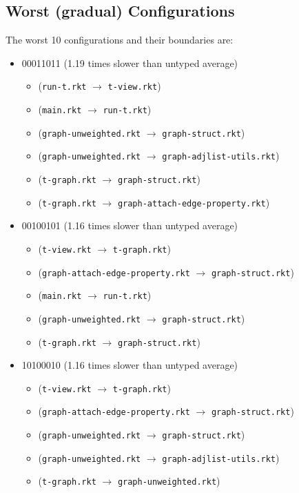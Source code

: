 \documentclass{article}
\newcommand{\mono}[1]{\texttt{#1}}
\begin{document}
\subsection{Worst (gradual) Configurations}
The worst 10 configurations and their boundaries are:
\begin{itemize}
\item 00011011 (1.19 times slower than untyped average)
  \begin{itemize}
  \item (\mono{run-t.rkt} $\rightarrow$ \mono{t-view.rkt})
  \item (\mono{main.rkt} $\rightarrow$ \mono{run-t.rkt})
  \item (\mono{graph-unweighted.rkt} $\rightarrow$ \mono{graph-struct.rkt})
  \item (\mono{graph-unweighted.rkt} $\rightarrow$ \mono{graph-adjlist-utils.rkt})
  \item (\mono{t-graph.rkt} $\rightarrow$ \mono{graph-struct.rkt})
  \item (\mono{t-graph.rkt} $\rightarrow$ \mono{graph-attach-edge-property.rkt})
  \end{itemize}
\item 00100101 (1.16 times slower than untyped average)
  \begin{itemize}
  \item (\mono{t-view.rkt} $\rightarrow$ \mono{t-graph.rkt})
  \item (\mono{graph-attach-edge-property.rkt} $\rightarrow$ \mono{graph-struct.rkt})
  \item (\mono{main.rkt} $\rightarrow$ \mono{run-t.rkt})
  \item (\mono{graph-unweighted.rkt} $\rightarrow$ \mono{graph-struct.rkt})
  \item (\mono{t-graph.rkt} $\rightarrow$ \mono{graph-struct.rkt})
  \end{itemize}
\item 10100010 (1.16 times slower than untyped average)
  \begin{itemize}
  \item (\mono{t-view.rkt} $\rightarrow$ \mono{t-graph.rkt})
  \item (\mono{graph-attach-edge-property.rkt} $\rightarrow$ \mono{graph-struct.rkt})
  \item (\mono{graph-unweighted.rkt} $\rightarrow$ \mono{graph-struct.rkt})
  \item (\mono{graph-unweighted.rkt} $\rightarrow$ \mono{graph-adjlist-utils.rkt})
  \item (\mono{t-graph.rkt} $\rightarrow$ \mono{graph-unweighted.rkt})

\end{itemize}
\end{itemize}
\end{document}
